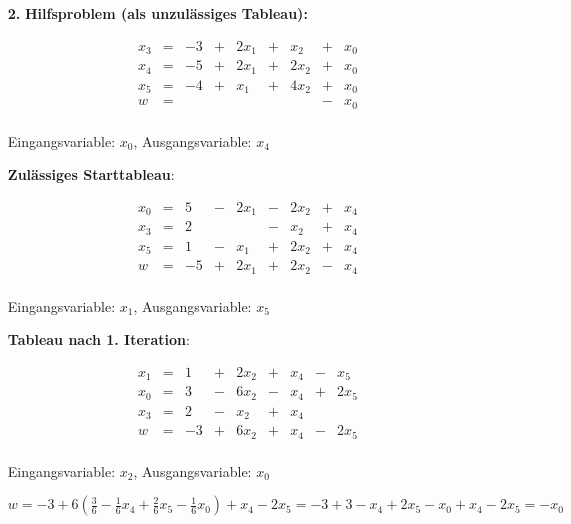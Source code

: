\documentclass[a4paper,11pt]{article}
\begin{document}
\begin{enumerate}
\begin{enumerate}
    \end{enumerate}

\item[\textbf{2.}]
        \textbf{Hilfsproblem (als unzulässiges Tableau):}

        \[\begin{array}{rcrcrcrcr}
            x_3 & = & -3 & + & 2x_1 & + & x_2 & + & x_0 \\[3pt]
            x_4 & = & -5 & + & 2x_1 & + & 2x_2 & + & x_0 \\[3pt]
            x_5 & = & -4 & + & x_1 & + & 4x_2 & + & x_0 \\[3pt] \hline
              w & = & & & & & & - & x_0\\
        \end{array}\]

        Eingangsvariable: $x_0$, Ausgangsvariable: $x_4$

        \textbf{Zulässiges Starttableau}:

        \[\begin{array}{rcrcrcrcr}
            x_0 & = & 5 & - & 2x_1 & - & 2x_2 & + & x_4 \\[3pt]
            x_3 & = & 2 &   &  & - & x_2 & + & x_4 \\[3pt]
            x_5 & = & 1 & - & x_1 & + & 2x_2 & + & x_4 \\[3pt] \hline
              w & = & -5& + & 2x_1 & + & 2x_2 & - & x_4\\
        \end{array}\]

        Eingangsvariable: $x_1$, Ausgangsvariable: $x_5$

        \textbf{Tableau nach 1. Iteration}:

        \[\begin{array}{rcrcrcrcr}
            x_1 & = & 1 & + & 2x_2 & + & x_4 & - &  x_5 \\[3pt]
            x_0 & = & 3 & - & 6x_2 & - & x_4 & + & 2x_5 \\[3pt]
            x_3 & = & 2 & - &  x_2 & + & x_4 &   &      \\[3pt] \hline
              w & = &-3 & + & 6x_2 & + & x_4 & - & 2x_5 \\[3pt]
        \end{array}\]

        Eingangsvariable: $x_2$, Ausgangsvariable: $x_0$

        \( w = -3 + 6 \left(  \frac{3}{6} - \frac{1}{6}x_4 + \frac{2}{6}x_5 - \frac{1}{6}x_0 \right) + x_4 - 2x_5
             = -3 + 3 - x_4 + 2x_5 - x_0 + x_4 - 2x_5 = -x_0 \)


\end{enumerate}
\end{document}
